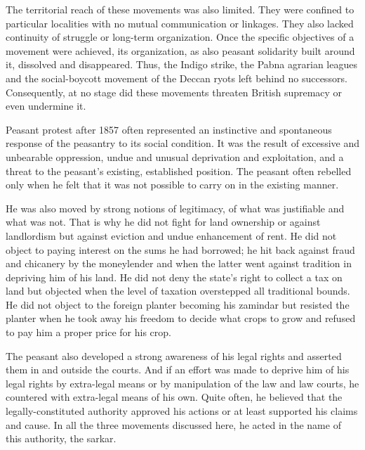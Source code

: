 The territorial reach of these movements was also limited. They were confined to particular localities with no mutual communication or linkages. They also lacked continuity of struggle or long-term organization. Once the specific objectives of a movement were achieved, its organization, as also peasant solidarity built around it, dissolved and disappeared. Thus, the Indigo strike, the Pabna agrarian leagues and the social-boycott movement of the Deccan ryots left behind no successors. Consequently, at no stage did these movements threaten British supremacy or even undermine it.

Peasant protest after 1857 often represented an instinctive and spontaneous response of the peasantry to its social condition. It was the result of excessive and unbearable oppression, undue and unusual deprivation and exploitation, and a threat to the peasant’s existing, established position. The peasant often rebelled only when he felt that it was not possible to carry on in the existing manner.

He was also moved by strong notions of legitimacy, of what was justifiable and what was not. That is why he did not fight for land ownership or against landlordism but against eviction and undue enhancement of rent. He did not object to paying interest on the sums he had borrowed; he hit back against fraud and chicanery by the moneylender and when the latter went against tradition in depriving him of his land. He did not deny the state’s right to collect a tax on land but objected when the level of taxation overstepped all traditional bounds. He did not object to the foreign planter becoming his zamindar but resisted the planter when he took away his freedom to decide what crops to grow and refused to pay him a proper price for his crop.

The peasant also developed a strong awareness of his legal rights and asserted them in and outside the courts. And if an effort was made to deprive him of his legal rights by extra-legal means or by manipulation of the law and law courts, he countered with extra-legal means of his own. Quite often, he believed that the legally-constituted authority approved his actions or at least supported his claims and cause. In all the three movements discussed here, he acted in the name of this authority, the sarkar.

